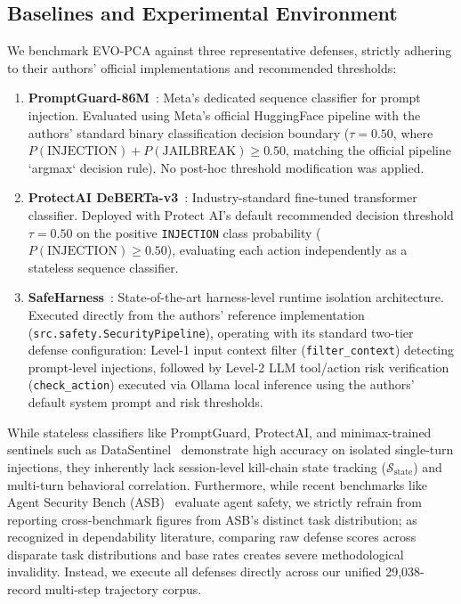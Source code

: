 \documentclass[conference]{IEEEtran}
\begin{document}
\subsection{Baselines and Experimental Environment}
We benchmark EVO-PCA against three representative defenses, strictly adhering to their authors' official implementations and recommended thresholds:
\begin{enumerate}[leftmargin=*]
    \item \textbf{PromptGuard-86M}~\cite{llamafirewall2024}: Meta's dedicated sequence classifier for prompt injection. Evaluated using Meta's official HuggingFace pipeline with the authors' standard binary classification decision boundary ($\tau = 0.50$, where $P(\text{INJECTION}) + P(\text{JAILBREAK}) \ge 0.50$, matching the official pipeline `argmax` decision rule). No post-hoc threshold modification was applied.
    \item \textbf{ProtectAI DeBERTa-v3}~\cite{protectai2024}: Industry-standard fine-tuned transformer classifier. Deployed with Protect AI's default recommended decision threshold $\tau = 0.50$ on the positive \texttt{INJECTION} class probability ($P(\text{INJECTION}) \ge 0.50$), evaluating each action independently as a stateless sequence classifier.
    \item \textbf{SafeHarness}~\cite{liu2024safeharness}: State-of-the-art harness-level runtime isolation architecture. Executed directly from the authors' reference implementation (\texttt{src.safety.SecurityPipeline}), operating with its standard two-tier defense configuration: Level-1 input context filter (\texttt{filter\_context}) detecting prompt-level injections, followed by Level-2 LLM tool/action risk verification (\texttt{check\_action}) executed via Ollama local inference using the authors' default system prompt and risk thresholds.
\end{enumerate}
While stateless classifiers like PromptGuard, ProtectAI, and minimax-trained sentinels such as DataSentinel~\cite{datasentinel2025} demonstrate high accuracy on isolated single-turn injections, they inherently lack session-level kill-chain state tracking ($\mathcal{S}_{\text{state}}$) and multi-turn behavioral correlation. Furthermore, while recent benchmarks like Agent Security Bench (ASB)~\cite{asb2025} evaluate agent safety, we strictly refrain from reporting cross-benchmark figures from ASB's distinct task distribution; as recognized in dependability literature, comparing raw defense scores across disparate task distributions and base rates creates severe methodological invalidity. Instead, we execute all defenses directly across our unified 29,038-record multi-step trajectory corpus.
\end{document}
